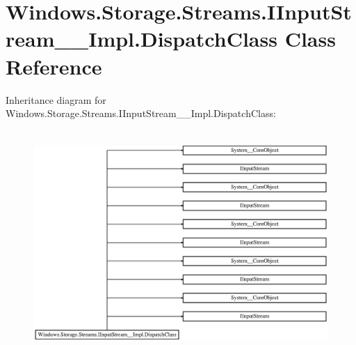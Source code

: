 \hypertarget{class_windows_1_1_storage_1_1_streams_1_1_i_input_stream_____impl_1_1_dispatch_class}{}\section{Windows.\+Storage.\+Streams.\+I\+Input\+Stream\+\_\+\+\_\+\+Impl.\+Dispatch\+Class Class Reference}
\label{class_windows_1_1_storage_1_1_streams_1_1_i_input_stream_____impl_1_1_dispatch_class}
Inheritance diagram for Windows.\+Storage.\+Streams.\+I\+Input\+Stream\+\_\+\+\_\+\+Impl.\+Dispatch\+Class\+:\begin{figure}[H]
\begin{center}
\leavevmode
\includegraphics[height=8.555555cm]{class_windows_1_1_storage_1_1_streams_1_1_i_input_stream_____impl_1_1_dispatch_class}
\end{center}
\end{figure}

